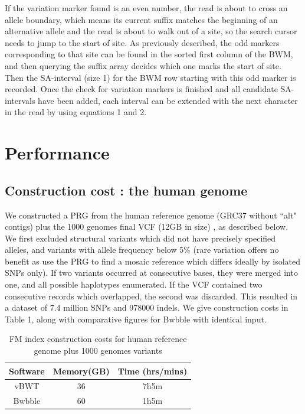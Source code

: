\documentclass[runningheads,a4paper]{llncs}
\begin{document}
If the variation marker found is an even number, the read is about to cross an allele boundary, which means its current suffix matches the beginning of an alternative allele and the read is about to walk out of a site, so the search cursor needs to jump to the start of site. As previously described, the odd markers corresponding to that site can be found in the sorted first column of the BWM, and then querying the suffix array decides which one marks the start of site. Then the SA-interval (size 1) for the BWM row starting with this odd marker is recorded.
Once the check for variation markers is finished and all candidate SA-intervals have been added, each interval can be extended with the next character in the read by using equations 1 and 2.




\section{Performance}
\subsection{Construction cost : the human genome}
We   constructed a PRG from the human reference genome (GRC37 without ``alt" contigs) plus the 1000 genomes final VCF (12GB in size) \cite{1000g}, as described below. We first  excluded structural variants which did not have precisely specified alleles, and variants with allele frequency below 5\% (rare variation offers no benefit as use the PRG to find a mosaic reference which differs ideally by isolated SNPs only). If two variants occurred at consecutive bases, they were merged into one, and all possible haplotypes enumerated. If the VCF contained two consecutive records which overlapped, the second was discarded. This resulted in a dataset of 7.4 million SNPs and 978000 indels. We give construction costs in Table 1, along with comparative figures for Bwbble with identical input. 
 
\begin{table}
\caption{FM index construction costs for human reference genome plus 1000 genomes variants}
\centering
\begin{tabular}{c c c}
\hline
Software  & Memory(GB) & Time (hrs/mins)\\
\hline
vBWT  & 36  & 7h5m \\
Bwbble  & 60 &  1h5m \\ 
\hline
\end{tabular}
\end{table}
\end{document}
